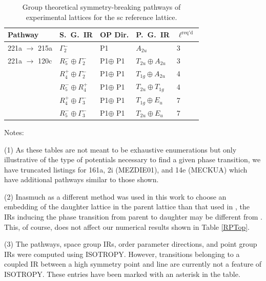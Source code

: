 \documentclass[preprint]{iucr}              %
\begin{document}
\pagebreak

\begin{table}%
\caption{Group theoretical symmetry-breaking pathways of
experimental lattices for the sc reference
lattice.}\label{pathwaysSC}\tiny
\begin{tabular}{lllll}\hline
Pathway & S.~G.~IR & OP Dir. & P.~G.~IR & $\ell^{\mathrm{req'd}}$  \\
\hline
221a $\rightarrow$ 215a & $\Gamma_2^-$ & P1 & $A_{2u}$ & 3 \\
221a $\rightarrow$ 120c & $R_5^-\oplus \Gamma_2^-$ & P1$ \oplus$ P1 & $T_{2u}
\oplus A_{2u}$  & 3 \\
& $R_4^+\oplus \Gamma_2^-$ & P1$ \oplus$ P1 & $T_{1g} \oplus A_{2u}$ & 4 \\
& $R_5^-\oplus R_4^+$ & P1$ \oplus$ P1 & $T_{2u} \oplus T_{1g}$  & 4 \\
& $R_4^+\oplus \Gamma_3^-$ & P1$ \oplus$ P1 & $T_{1g} \oplus E_u$  & 7 \\
& $R_5^-\oplus \Gamma_3^-$ & P1$ \oplus$ P1 & $T_{2u} \oplus E_u$  & 7 \\
\hline
\end{tabular}
\end{table}

Notes: 

(1) As these tables are not meant to be exhaustive enumerations but only
illustrative of the type of potentials necessary to find a given phase
transition, we have truncated listings for 161a, 2i (MEZDIE01), and 14e (MECKUA)
which have additional pathways similar to those shown. 

(2) Inasmuch as a different method was used in this work to choose an embedding
of the daughter lattice in the parent lattice than that used in
\cite{McClurg09}, the IRs inducing the phase transition from parent to daughter
may be different from \cite{McClurg09}.  This, of course, does not affect our
numerical results shown in Table \ref{RPTop}.

(3)  The pathways, space group IRs, order parameter directions, and point group
IRs were computed using ISOTROPY.
However, transitions belonging to a coupled IR between a high symmetry point and
line
are currently not a feature of ISOTROPY.  These entries have been marked with an
asterisk in
the table.
\end{document}
